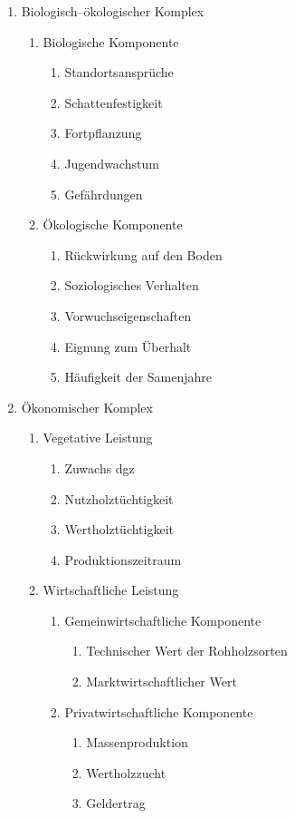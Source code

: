 \documentclass[twocolumn]{scrartcl}
\begin{document}
\begin{enumerate}
\item Biologisch--ökologischer Komplex
  \begin{enumerate}
  \item Biologische Komponente
    \begin{enumerate}
    \item Standortsansprüche
    \item Schattenfestigkeit
    \item Fortpflanzung
    \item Jugendwachstum
    \item Gefährdungen
    \end{enumerate}
  \item Ökologische Komponente
    \begin{enumerate}
    \item Rückwirkung auf den Boden
    \item Soziologisches Verhalten
    \item Vorwuchseigenschaften
    \item Eignung zum Überhalt
    \item Häufigkeit der Samenjahre
    \end{enumerate}
  \end{enumerate}
\item Ökonomischer Komplex
  \begin{enumerate}
  \item Vegetative Leistung
    \begin{enumerate}
    \item Zuwachs dgz
    \item Nutzholztüchtigkeit
    \item Wertholztüchtigkeit
    \item Produktionszeitraum
    \end{enumerate}
  \item Wirtschaftliche Leistung
    \begin{enumerate}
    \item Gemeinwirtschaftliche Komponente
      \begin{enumerate}
      \item Technischer Wert der Rohholzsorten
      \item Marktwirtschaftlicher Wert
      \end{enumerate}
    \item Privatwirtschaftliche Komponente
      \begin{enumerate}
      \item Massenproduktion
      \item Wertholzzucht
      \item Geldertrag
      \end{enumerate}
    \end{enumerate}
  \end{enumerate}
\end{enumerate}
\end{document}
